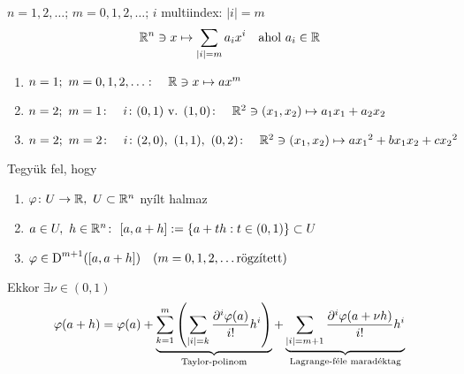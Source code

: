 \begin{de} \ \\$n=1,2,\dotsc$; $m=0,1,2,\dotsc$; $i$ multiindex: $|i|=m$
  \[\mathbb{R}^n\owns x\mapsto \sum_{|i|=m}a_ix^i\quad \text{ahol }a_i\in\mathbb{R}\]  
\end{de}

\begin{spec}{\listazjromai\begin{enumerate}
  \item $n=1;\ m=0,1,2,\dotsc\colon\quad \mathbb{R}\owns x\mapsto ax^m$
  \item $n=2;\ m=1\colon\quad i\colon (0,1) \text { v. }(1,0)\colon\quad \mathbb{R}^2\owns(x_1,x_2)\mapsto a_1x_1+a_2x_2$
  \item $n=2;\ m=2\colon\quad i\colon (2,0),\ (1,1),\ (0,2)\colon\quad \R^2\owns(x_1,x_2)\mapsto a{x_1}^2+bx_1x_2 +
    c{x_2}^2$    
  \end{enumerate} }
\end{spec}

\begin{te}Tegyük fel, hogy
  {\listazjbetu \begin{enumerate}
    \item $\vfi\colon U\n\R,\ U\subset\R^n$ nyílt halmaz
    \item $a\in U,\ h\in\mathbb{R}^n\colon\ [a,a+h] := \{a+th:t\in(0,1)\}\subset U$
    \item $\varphi\in\operatorname{D}^{m+1}([a,a+h])\quad(m=0,1,2,\dotsc\text{rögzített})$
  \end{enumerate} }
  Ekkor $\exists \nu\in(0,1)$
  \[ \displaystyle\varphi(a+h) = \varphi(a) + \underbrace{\sum_{k=1}^m\left(\sum_{|i|=k}\dfrac{\partial^i\varphi(a)}{i!}h^i\right)}
  _{\text{Taylor-polinom}} + \underbrace{\sum_{|i|=m+1}\dfrac{\partial^i\varphi(a+\nu h)}{i!}h^i}
  _{\text{Lagrange-féle maradéktag}}\]  
\end{te}

